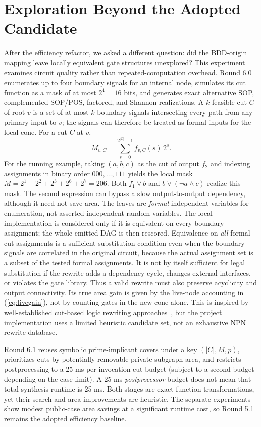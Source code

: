 \documentclass[journal,10pt]{IEEEtran}
\begin{document}
\section{Exploration Beyond the Adopted Candidate}
After the efficiency refactor, we asked a different question: did the BDD-origin mapping leave locally equivalent gate structures unexplored? This experiment examines circuit quality rather than repeated-computation overhead. Round 6.0 enumerates up to four boundary signals for an internal node, simulates its cut function as a mask of at most $2^4=16$ bits, and generates exact alternative SOP, complemented SOP/POS, factored, and Shannon realizations. A $k$-feasible cut $C$ of root $v$ is a set of at most $k$ boundary signals intersecting every path from any primary input to $v$; the signals can therefore be treated as formal inputs for the local cone. For a cut $C$ at $v$,
\begin{equation}
 M_{v,C}=\sum_{s=0}^{2^{|C|}-1} f_{v,C}(s)\,2^s.
\end{equation}
For the running example, taking $(a,b,c)$ as the cut of output $f_2$ and indexing assignments in binary order $000,\ldots,111$ yields the local mask
$M=2^1+2^2+2^3+2^6+2^7=206$. Both $f_1\lor b$ and $b\lor(\neg a\land c)$ realize this mask. The second expression can bypass a slow output-to-output dependency, although it need not save area.
The leaves are \emph{formal} independent variables for enumeration, not asserted independent random variables. The local implementation is considered only if it is equivalent on every boundary assignment; the whole emitted DAG is then rescored. Equivalence on \emph{all} formal cut assignments is a sufficient substitution condition even when the boundary signals are correlated in the original circuit, because the actual assignment set is a subset of the tested formal assignments. It is not by itself sufficient for legal substitution if the rewrite adds a dependency cycle, changes external interfaces, or violates the gate library. Thus a valid rewrite must also preserve acyclicity and output connectivity. Its true area gain is given by the live-node accounting in (\ref{eq:livegain}), not by counting gates in the new cone alone. This is inspired by well-established cut-based logic rewriting approaches~\cite{mishchenko2006,abc}, but the project implementation uses a limited heuristic candidate set, not an exhaustive NPN rewrite database.

Round 6.1 reuses symbolic prime-implicant covers under a key $(|C|,M,p)$, prioritizes cuts by potentially removable private subgraph area, and restricts postprocessing to a 25 ms per-invocation cut budget (subject to a second budget depending on the case limit). A 25 ms \emph{postprocessor} budget does not mean that total synthesis runtime is 25 ms. Both stages are exact-function transformations, yet their search and area improvements are heuristic. The separate experiments show modest public-case area savings at a significant runtime cost, so Round 5.1 remains the adopted efficiency baseline.
\end{document}
